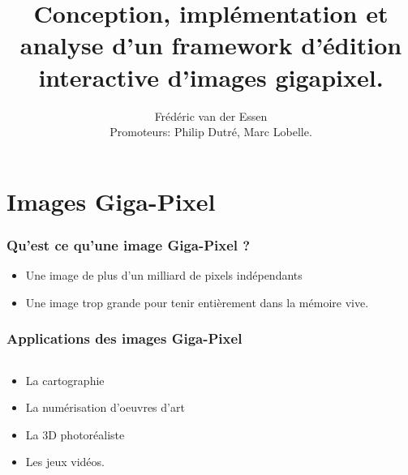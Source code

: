 \documentclass[slidetop,compress,mathserif]{beamer}
\title{Conception, implémentation et analyse d'un framework d'édition interactive d'images gigapixel.}
\author{Frédéric van der Essen \\ Promoteurs: Philip Dutré, Marc Lobelle.}
\begin{document}
	\begin{frame}
		\titlepage
	\end{frame}
	\section{Images Giga-Pixel}
	\begin{frame}
		\frametitle{Qu'est ce qu'une image Giga-Pixel ?}
		\begin{itemize}
			\pause \item Une image de plus d'un milliard de pixels indépendants
			\pause \item Une image trop grande pour tenir entièrement dans la mémoire vive.
		\end{itemize}
	\end{frame}
	\begin{frame}
		\frametitle{Applications des images Giga-Pixel}
		\begin{columns}
			\begin{column}{0.5\textwidth}
				\begin{itemize}
					\item<2-> La cartographie
					\item<3-> La numérisation d'oeuvres d'art
					\item<4-> La 3D photoréaliste
					\item<5-> Les jeux vidéos.
				\end{itemize}
			\end{column}
			\begin{column}{0.5\textwidth}
\end{column}
\end{columns}
\end{frame}
\end{document}

